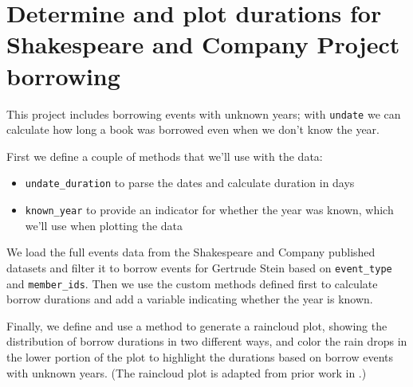 \documentclass{anthology-ch}         %
\begin{document}
\section{Determine and plot durations for Shakespeare and Company Project borrowing}\label{appdx:shxco-duration-raincloud}

This project includes borrowing events with unknown years; with \texttt{undate} we can calculate how long a book was borrowed even when we don't know the year. 

First we define a couple of methods that we'll use with the data:
\begin{itemize}
    \item \texttt{undate\_duration} to parse the dates and calculate duration in days
    \item \texttt{known\_year} to provide an indicator for whether the year was known, which we'll use when plotting the data
\end{itemize}

We load the full events data from the Shakespeare and Company published datasets \cite{koeser_shakespeare_2025} and filter it to borrow events for Gertrude Stein based on \texttt{event\_type} and \texttt{member\_ids}.  Then we use the custom methods defined first to calculate borrow durations and add a variable indicating whether the year is known.

Finally, we define and use a method to generate a raincloud plot, showing the distribution of borrow durations in two different ways, and color the rain drops in the lower portion of the plot to highlight the durations based on borrow events with unknown years. (The raincloud plot is adapted from prior work in \cite{koeser_missing_2024}.)
\end{document}

